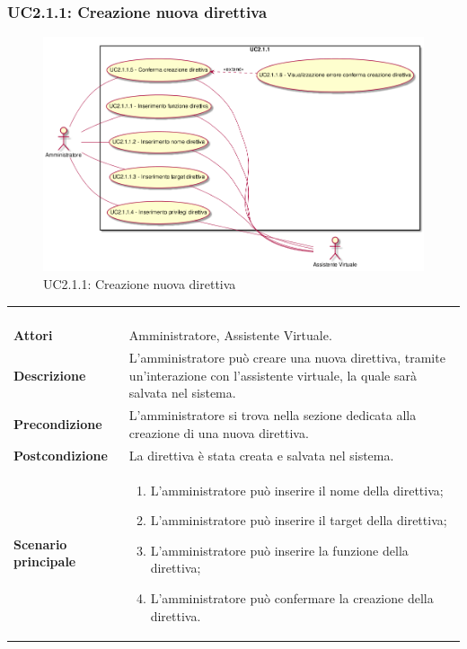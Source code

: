 \newpage\subsubsection{UC2.1.1: Creazione nuova direttiva}
\label{UC2.1.1}
\begin{figure}[h]
\centering
\includegraphics[width=\textwidth,height=\textheight,keepaspectratio]{images/UseCaseUC211.png}
\caption{UC2.1.1: Creazione nuova direttiva}
\end{figure}
\begin{longtable}{l|p{10cm}}
\rowcolor[gray]{0.8} \multicolumn{2}{c}{} \\
\rowcolor[gray]{0.8} \multicolumn{2}{c}{\textbf{UC2.1.1 - Creazione nuova direttiva}} \\
\rowcolor[gray]{0.8} \multicolumn{2}{c}{} \\
\hline
&\\
\textbf{Attori} & Amministratore, Assistente Virtuale.\\[7pt]
\textbf{Descrizione} & L'amministratore può creare una nuova direttiva, tramite un'interazione con l'assistente virtuale, la quale sarà salvata nel sistema.\\[7pt]
\textbf{Precondizione} & L'amministratore si trova nella sezione dedicata alla creazione di una nuova direttiva.\\[7pt]
\textbf{Postcondizione} & La direttiva è stata creata e salvata nel sistema.\\[7pt]
\textbf{Scenario principale} &\begin{enumerate}
\item  L'amministratore può inserire il nome della direttiva;
\item  L'amministratore può inserire il target della direttiva;
\item  L'amministratore può inserire la funzione della direttiva;
\item  L'amministratore può confermare la creazione della direttiva. 
\end{enumerate}
\\[7pt]\hline
\end{longtable}

